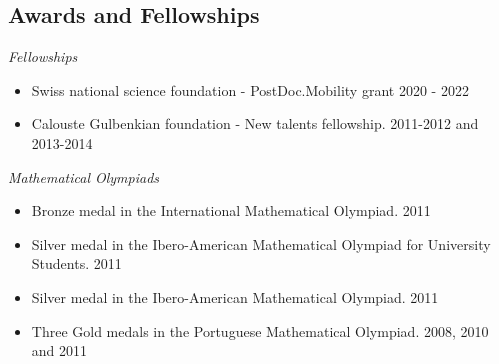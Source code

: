 \documentclass[margin, 10pt]{res} %
\begin{document}
\begin{resume}
\section{Awards and Fellowships}


{\sl Fellowships}
\begin{itemize} 

\item Swiss national science foundation - PostDoc.Mobility grant {\tiny 2020 - 2022}

\item Calouste Gulbenkian foundation - \tiny{New talents fellowship. 2011-2012 and 2013-2014}
\end{itemize} 
\vspace{-0.2cm}

{\sl Mathematical Olympiads}
\begin{itemize} \itemsep -2pt %
\item Bronze medal in the International Mathematical Olympiad. {\tiny 2011}
\item Silver medal in the Ibero-American Mathematical Olympiad for
University Students. {\tiny 2011}
\item Silver medal in the Ibero-American Mathematical Olympiad. {\tiny 2011}
\item Three Gold medals in the Portuguese Mathematical Olympiad. {\tiny 2008, 2010 and 2011}
\end{itemize}


\vspace{-0.2cm}


\end{resume}
\end{document}
